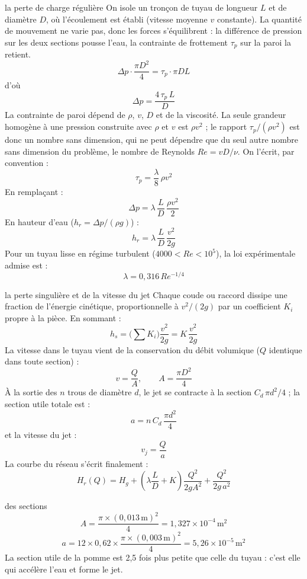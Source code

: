 \documentclass[11pt,a4paper]{article}
\newcommand{\U}[1]{\,\mathrm{#1}}
\begin{document}
\begin{calcul}{la perte de charge régulière}
On isole un tronçon de tuyau de longueur $L$ et de diamètre $D$, où l'écoulement est établi (vitesse moyenne $v$ constante). La quantité de mouvement ne varie pas, donc les forces s'équilibrent : la différence de pression sur les deux sections pousse l'eau, la contrainte de frottement $\tau_p$ sur la paroi la retient.
\[ \Delta p \cdot \frac{\pi D^2}{4} = \tau_p \cdot \pi D L \]
d'où
\[ \Delta p = \frac{4\,\tau_p\,L}{D} \]
La contrainte de paroi dépend de $\rho$, $v$, $D$ et de la viscosité. La seule grandeur homogène à une pression construite avec $\rho$ et $v$ est $\rho v^2$ ; le rapport $\tau_p/(\rho v^2)$ est donc un nombre sans dimension, qui ne peut dépendre que du seul autre nombre sans dimension du problème, le nombre de Reynolds $Re = vD/\nu$. On l'écrit, par convention :
\[ \tau_p = \frac{\lambda}{8}\,\rho v^2 \]
En remplaçant :
\[ \Delta p = \lambda\,\frac{L}{D}\,\frac{\rho v^2}{2} \]
En hauteur d'eau ($h_r = \Delta p/(\rho g)$) :
\[ h_r = \lambda\,\frac{L}{D}\,\frac{v^2}{2g} \]
Pour un tuyau lisse en régime turbulent ($4000 < Re < 10^5$), la loi expérimentale admise est :
\[ \lambda = 0{,}316\,Re^{-1/4} \]
\end{calcul}

\begin{calcul}{la perte singulière et de la vitesse du jet}
Chaque coude ou raccord dissipe une fraction de l'énergie cinétique, proportionnelle à $v^2/(2g)$ par un coefficient $K_i$ propre à la pièce. En sommant :
\[ h_s = \Big(\sum K_i\Big)\frac{v^2}{2g} = K\,\frac{v^2}{2g} \]
La vitesse dans le tuyau vient de la conservation du débit volumique ($Q$ identique dans toute section) :
\[ v = \frac{Q}{A}, \qquad A = \frac{\pi D^2}{4} \]
À la sortie des $n$ trous de diamètre $d$, le jet se contracte à la section $C_d\,\pi d^2/4$ ; la section utile totale est :
\[ a = n\,C_d\,\frac{\pi d^2}{4} \]
et la vitesse du jet :
\[ v_j = \frac{Q}{a} \]
La courbe du réseau s'écrit finalement :
\[ H_r(Q) = H_g + \left(\lambda\frac{L}{D} + K\right)\frac{Q^2}{2gA^2} + \frac{Q^2}{2g\,a^2} \]
\end{calcul}

\begin{calcul}{des sections}
\[ A = \frac{\pi \times (0{,}013\U{m})^2}{4} = 1{,}327\times10^{-4}\U{m^2} \]
\[ a = 12 \times 0{,}62 \times \frac{\pi \times (0{,}003\U{m})^2}{4} = 5{,}26\times10^{-5}\U{m^2} \]
La section utile de la pomme est 2,5 fois plus petite que celle du tuyau : c'est elle qui accélère l'eau et forme le jet.
\end{calcul}
\end{document}
